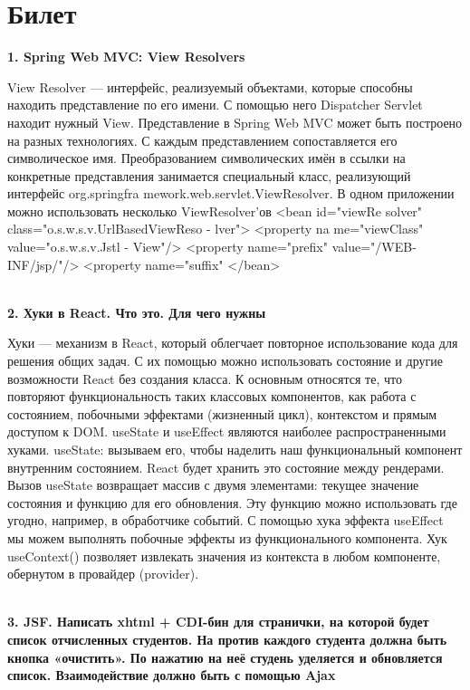 \documentclass{article}
\newcommand{\bil}[5]{%
        \section{Билет}
        \textbf{1. #1}

        #4
        \\
        \textbf{2. #2}
        
        #5
        \\
        \textbf{3. #3}
}
\begin{document}
\bil{Spring Web MVC: View Resolvers}
{Хуки в React. Что это. Для чего нужны}
{JSF. Написать xhtml + CDI-бин для странички, на которой будет список отчисленных студентов. На против каждого студента должна быть кнопка «очистить». По нажатию на неё студень уделяется и обновляется список. Взаимодействие должно быть с помощью Ajax}{
    View Resolver — интерфейс, реализуемый объектами, которые способны находить представление по его имени. 
    С помощью него Dispatcher Servlet находит нужный View.
    Представление в Spring Web MVC может быть построено на разных технологиях.
    С каждым представлением сопоставляется его символическое имя.
    Преобразованием символических имён в ссылки на конкретные представления занимается специальный класс, реализующий интерфейс org.springfra mework.web.servlet.ViewResolver.
    В одном приложении можно использовать несколько ViewResolver'ов
    <bean id="viewRe solver" class="o.s.w.s.v.UrlBasedViewReso - lver"> <property na me="viewClass"
              value="o.s.w.s.v.Jstl - View"/>
    <property name="prefix"
              value="/WEB-INF/jsp/"/>
    <property name="suffix"
</bean>
}{
    Хуки — механизм в React, который облегчает повторное использование кода для решения общих задач. 
    С их помощью можно использовать состояние и другие возможности React без создания класса.
    К основным относятся те, что повторяют функциональность таких классовых компонентов, как работа с состоянием, побочными эффектами (жизненный цикл), контекстом и прямым доступом к DOM.
    useState и useEffect являются наиболее распространенными хуками.
    useState: вызываем его, чтобы наделить наш функциональный компонент внутренним состоянием. React будет хранить это состояние между рендерами. 
    Вызов useState возвращает массив с двумя элементами: текущее значение состояния и функцию для его обновления. 
    Эту функцию можно использовать где угодно, например, в обработчике событий. 
    С помощью хука эффекта useEffect мы можем выполнять побочные эффекты из функционального компонента.
    Хук useContext() позволяет извлекать значения из контекста в любом компоненте, обернутом в провайдер (provider).
}
\end{document}

